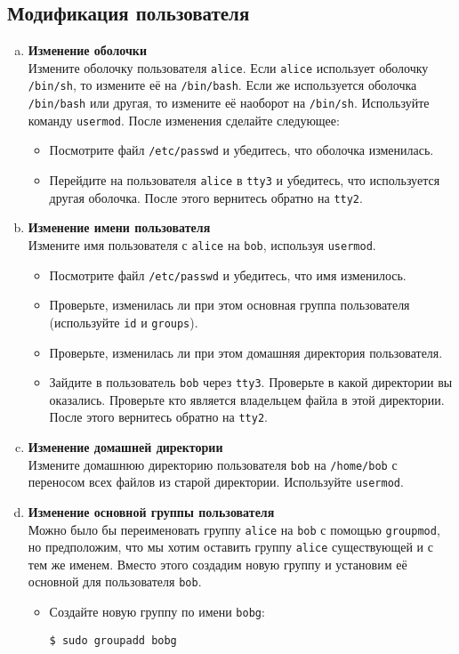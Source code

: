 \documentclass{article}
\begin{document}
\subsection{Модификация пользователя}
\begin{enumerate}[a.]
\item \textbf{Изменение оболочки}\\
Измените оболочку пользователя \texttt{alice}. Если \texttt{alice} использует оболочку \texttt{/bin/sh}, то измените её на \texttt{/bin/bash}. Если же используется оболочка \texttt{/bin/bash} или другая, то измените её наоборот на \texttt{/bin/sh}. Используйте команду \texttt{usermod}. После изменения сделайте следующее:
\begin{itemize}
\item Посмотрите файл \texttt{/etc/passwd} и убедитесь, что оболочка изменилась.
\item Перейдите на пользователя \texttt{alice} в \texttt{tty3} и убедитесь, что используется другая оболочка. После этого вернитесь обратно на \texttt{tty2}.
\end{itemize}

\item \textbf{Изменение имени пользователя}\\
Измените имя пользователя с \texttt{alice} на \texttt{bob}, используя \texttt{usermod}.
\begin{itemize}
\item Посмотрите файл \texttt{/etc/passwd} и убедитесь, что имя изменилось.
\item Проверьте, изменилась ли при этом основная группа пользователя (используйте \texttt{id} и \texttt{groups}).
\item Проверьте, изменилась ли при этом домашняя директория пользователя.
\item Зайдите в пользователь \texttt{bob} через \texttt{tty3}. Проверьте в какой директории вы оказались. Проверьте кто является владельцем файла в этой директории. После этого вернитесь обратно на \texttt{tty2}.
\end{itemize}


\item \textbf{Изменение домашней директории}\\
Измените домашнюю директорию пользователя \texttt{bob} на \texttt{/home/bob} с переносом всех файлов из старой директории. Используйте \texttt{usermod}.

\item \textbf{Изменение основной группы пользователя}\\
Можно было бы переименовать группу \texttt{alice} на \texttt{bob} с помощью \texttt{groupmod}, но предположим, что мы хотим оставить группу \texttt{alice} существующей и с тем же именем. Вместо этого создадим новую группу и установим её основной для пользователя \texttt{bob}.
\begin{itemize}
\item Создайте новую группу по имени \texttt{bobg}:
\begin{lstlisting}
$ sudo groupadd bobg
\end{lstlisting}


\end{itemize}
\end{enumerate}
\end{document}
